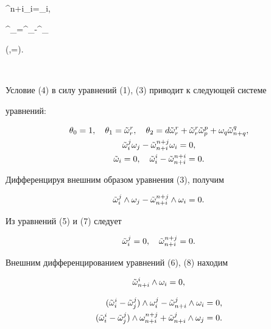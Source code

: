 \Omega^{n+i}_i=\Omega_i, \quad 


\Tilde\omega^\delta_\gamma=\Omega^\delta_\gamma-\omega^\delta_\gamma 


\quad(\delta,\gamma=). 


$$ 


Условие (4) в силу уравнений (1), (3) приводит к следующей системе 


уравнений:


\begin{gather} 


\theta_0=1,\quad \theta_1=\Tilde\omega^r_r,\quad 


\theta_2=d\Tilde\omega^r_r+\Tilde\omega^r_r\Tilde\omega^p_p+ 


\omega_q\Tilde\omega^q_{n+q}\notag,\\ 


\Tilde\omega^j_i\omega_j-\Tilde\omega^{n+j}_{n+i}\omega_i=0,\\ 


\Tilde\omega_i=0,\quad \Tilde\omega^i_i-\Tilde\omega^{n+i}_{n+i}=0. 


\end{gather} 


Дифференцируя внешним образом уравнения (3), получим 


\begin{equation} 


\Tilde\omega^j_i\wedge\omega_j-\Tilde\omega^{n+j}_{n+i} 


\wedge\omega_i=0. 


\end{equation} 


Из уравнений (5) и (7) следует


\begin{equation} 


\Tilde\omega^j_i=0,\quad \Tilde\omega^{n+j}_{n+i}=0. 


\end{equation} 


Внешним дифференцированием уравнений (6), (8) находим 


\begin{equation} 


\Tilde\omega^i_{n+i}\wedge\omega_i=0, 


\end{equation} 


\begin{equation} 


\begin{split} 


(\Tilde\omega^i_i-\Tilde\omega^j_j)\wedge\omega^j_i- 


\Tilde\omega^j_{n+i}\wedge\omega_i&=0,\\ 


(\Tilde\omega^i_i-\Tilde\omega^j_j)\wedge\omega^{n+j}_{n+i}+ 


\Tilde\omega^j_{n+i}\wedge\omega_j&=0.


\end{split} 


\end{equation} 


